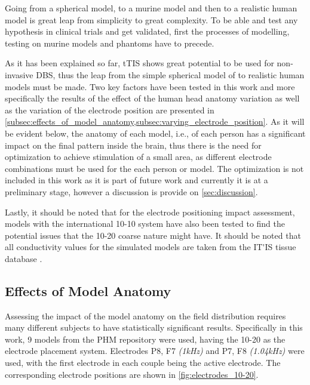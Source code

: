 Going from a spherical model, to a murine model and then to a realistic human model is great leap from simplicity to great complexity. To be able and test any hypothesis in clinical trials and get validated, first the processes of modelling, testing on murine models and phantoms have to precede.

As it has been explained so far, \gls{tTIS} shows great potential to be used for non-invasive \gls{DBS}, thus the leap from the simple spherical model of  to realistic human models must be made. Two key factors have been tested in this work and more specifically the results of the effect of the human head anatomy variation as well as the variation of the electrode position are presented in \cref{subsec:effects_of_model_anatomy,subsec:varying_electrode_position}. As it will be evident below, the anatomy of each model, i.e., of each person has a significant impact on the final pattern inside the brain, thus there is the need for optimization to achieve stimulation of a small area, as different electrode combinations must be used for the each person or model. The optimization is not included in this work as it is part of future work and currently it is at a preliminary stage, however a discussion is provide on \autoref{sec:discussion}.

Lastly, it should be noted that for the electrode positioning impact assessment, models with the international 10-10 system have also been tested to find the potential issues that the 10-20 coarse nature might have. It should be noted that all conductivity values for the simulated models are taken from the \gls{IT'IS} tissue database \cite{ITstissue}.

\subsection{Effects of Model Anatomy}
\label{subsec:effects_of_model_anatomy}

Assessing the impact of the model anatomy on the field distribution requires many different subjects to have statistically significant results. Specifically in this work, 9 models from the \gls{PHM} repository \cite{ErikG.Lee2016} were used, having the 10-20 as the electrode placement system. Electrodes P8, F7 \textit{(1\si{kHz})} and P7, F8 \textit{(1.04\si{kHz})} were used, with the first electrode in each couple being the active electrode. The corresponding electrode positions are shown in \autoref{fig:electrodes_10-20}.

